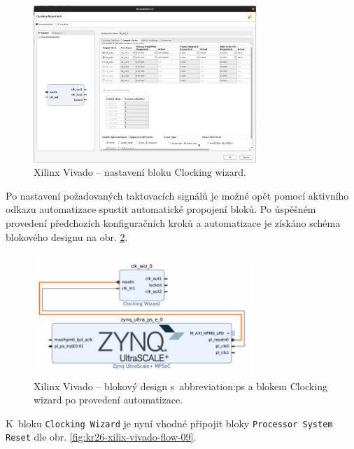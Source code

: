 \documentclass[a4paper, twoside, 11pt]{article}
\begin{document}
				\begin{figure}[htbp!]
					\centering
					\includegraphics[width=0.75\textwidth]{src/png/kr26-xilinx-vivado-flow/kr26-xilix-vivado-flow-07.jpg}
					\caption{Xilinx Vivado – nastavení bloku Clocking wizard.}
					\label{fig:kr26-xilix-vivado-flow-07}
				\end{figure}
				Po nastavení požadovaných taktovacích signálů je možné opět pomocí aktivního odkazu automatizace spustit automatické propojení bloků. Po úspěšném provedení předchozích konfiguračních kroků a automatizace je získáno schéma blokového designu na obr. \ref{fig:kr26-xilix-vivado-flow-08}.

				\begin{figure}[htbp!]
					\centering
					\includegraphics[width=0.75\textwidth]{src/png/kr26-xilinx-vivado-flow/kr26-xilix-vivado-flow-08.jpg}
					\caption{Xilinx Vivado – blokový design s~\gls{abbreviation:ps} a blokem Clocking wizard po provedení automatizace.}
					\label{fig:kr26-xilix-vivado-flow-08}
				\end{figure}

				K~bloku \texttt{Clocking Wizard} je nyní vhodné připojit bloky \texttt{Processor System Reset} dle obr. \ref{fig:kr26-xilix-vivado-flow-09}.
\end{document}
